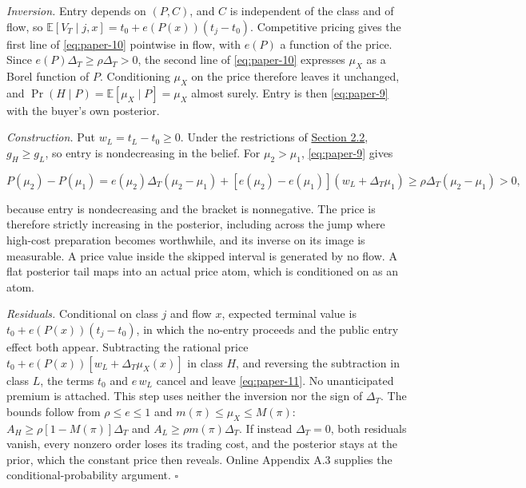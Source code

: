 \emph{Inversion.} Entry depends on \((P,C)\), and \(C\) is independent
of the class and of flow, so
\(\mathbb E[V_T\mid j,x]=t_0+e(P(x))(t_j-t_0)\). Competitive pricing
gives the first line of \eqref{eq:paper-10} pointwise in flow, with
\(e(P)\) a function of the price. Since
\(e(P)\Delta_T\ge\rho\Delta_T>0\), the second line of
\eqref{eq:paper-10} expresses \(\mu_X\) as a Borel function of \(P\).
Conditioning \(\mu_X\) on the price therefore leaves it unchanged, and
\(\Pr(H\mid P)=\mathbb E[\mu_X\mid P]=\mu_X\) almost surely. Entry is
then \eqref{eq:paper-9} with the buyer's own posterior.

\emph{Construction.} Put \(w_L=t_L-t_0\ge0\). Under the restrictions of
\hyperref[sec-values-preparation-and-the-sale]{Section 2.2},
\(g_H\ge g_L\), so entry is nondecreasing in the belief. For
\(\mu_2>\mu_1\), \eqref{eq:paper-9} gives

\[
P(\mu_2)-P(\mu_1)
=e(\mu_2)\Delta_T(\mu_2-\mu_1)+[e(\mu_2)-e(\mu_1)](w_L+\Delta_T\mu_1)
\ge\rho\Delta_T(\mu_2-\mu_1)>0,
\tag{A.3}\label{eq:paper-a-3}
\]

because entry is nondecreasing and the bracket is nonnegative. The price
is therefore strictly increasing in the posterior, including across the
jump where high-cost preparation becomes worthwhile, and its inverse on
its image is measurable. A price value inside the skipped interval is
generated by no flow. A flat posterior tail maps into an actual price
atom, which is conditioned on as an atom.

\emph{Residuals.} Conditional on class \(j\) and flow \(x\), expected
terminal value is \(t_0+e(P(x))(t_j-t_0)\), in which the no-entry
proceeds and the public entry effect both appear. Subtracting the
rational price \(t_0+e(P(x))[w_L+\Delta_T\mu_X(x)]\) in class \(H\), and
reversing the subtraction in class \(L\), the terms \(t_0\) and
\(e\,w_L\) cancel and leave \eqref{eq:paper-11}. No unanticipated
premium is attached. This step uses neither the inversion nor the sign
of \(\Delta_T\). The bounds follow from \(\rho\le e\le1\) and
\(m(\pi)\le\mu_X\le M(\pi)\): \(A_H\ge\rho[1-M(\pi)]\Delta_T\) and
\(A_L\ge\rho m(\pi)\Delta_T\). If instead \(\Delta_T=0\), both residuals
vanish, every nonzero order loses its trading cost, and the posterior
stays at the prior, which the constant price then reveals. Online
Appendix A.3 supplies the conditional-probability argument. \(\square\)
